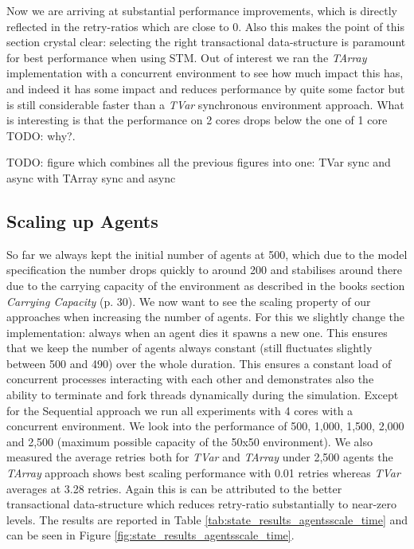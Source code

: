 Now we are arriving at substantial performance improvements, which is directly reflected in the retry-ratios which are close to 0. Also this makes the point of this section crystal clear: selecting the right transactional data-structure is paramount for best performance when using STM. Out of interest we ran the \textit{TArray} implementation with a concurrent environment to see how much impact this has, and indeed it has some impact and reduces performance by quite some factor but is still considerable faster than a \textit{TVar} synchronous environment approach. What is interesting is that the performance on 2 cores drops below the one of 1 core TODO: why?.

TODO: figure which combines all the previous figures into one: TVar sync and async with TArray sync and async

\subsection{Scaling up Agents}
So far we always kept the initial number of agents at 500, which due to the model specification the number drops quickly to around 200 and stabilises around there due to the carrying capacity of the environment as described in the books \cite{epstein_growing_1996} section \textit{Carrying Capacity} (p. 30). We now want to see the scaling property of our approaches when increasing the number of agents. For this we slightly change the implementation: always when an agent dies it spawns a new one. This ensures that we keep the number of agents always constant (still fluctuates slightly between 500 and 490) over the whole duration. This ensures a constant load of concurrent processes interacting with each other and demonstrates also the ability to terminate and fork threads dynamically during the simulation.
Except for the Sequential approach we run all experiments with 4 cores with a concurrent environment. We look into the performance of 500, 1,000, 1,500, 2,000 and 2,500 (maximum possible capacity of the 50x50 environment). We also measured the average retries both for \textit{TVar} and \textit{TArray} under 2,500 agents  the \textit{TArray} approach shows best scaling performance with 0.01 retries whereas \textit{TVar} averages at 3.28 retries. Again this is can be attributed to the better transactional data-structure which reduces retry-ratio substantially to near-zero levels. The results are reported in Table \ref{tab:state_results_agentsscale_time} and can be seen in Figure \ref{fig:state_results_agentsscale_time}.


